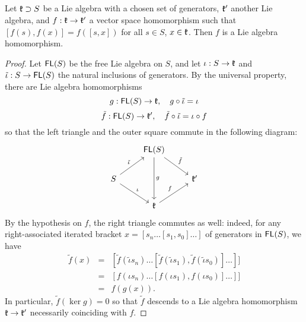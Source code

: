 \subsection{}
\begin{lem} \label{lem:aux}
        Let $\mathfrak{k} \supset S$ be a Lie algebra with a chosen set of generators,
$\mathfrak{k}'$ another Lie algebra, and $f : \mathfrak{k} \to \mathfrak{k}'$ a vector space homomorphism
such that $[f(s), f(x)] = f([s,x])$ for all $s \in S$, $x \in \mathfrak{k}$. Then $f$ is a
Lie algebra homomorphism. 
\end{lem}
\begin{proof}Let $\operatorname{\mathsf{FL}}(S)$ be the free Lie algebra on $S$, and let $\iota : S \to \mathfrak{k}$ and
        $\tilde\iota : S \to \operatorname{\mathsf{FL}}(S)$ the natural inclusions of generators. By the universal
property, there are Lie algebra homomorphisms 
\[  g : \operatorname{\mathsf{FL}}(S) \to \mathfrak{k},\quad  g \circ \tilde\iota = \iota \]
\[  \tilde f: \operatorname{\mathsf{FL}}(S) \to \mathfrak{k}',\quad \tilde f \circ \tilde\iota = \iota\circ f \]
so that the left triangle and the outer square commute in the following
diagram:
\[\begin{tikzcd}
& \FL(S) \arrow[dr,"\tilde f"] \arrow[dd,"g"]\\
        S \arrow[dr,"\iota"] \arrow[ur,"\tilde\iota"] & & \fk' \\
                                             & \fk \arrow[ur,"f"]  
\end{tikzcd}\]
By the hypothesis on $f$, the right triangle commutes as well: indeed,
for any right-associated iterated bracket $x = [s_n\dots[s_1,s_0]\dots]$ of generators 
in $\operatorname{\mathsf{FL}}(S)$, we have 
\begin{eqnarray*}
        \tilde f(x) &=& [\tilde f(\tilde\iota s_n)\dots[\tilde f(\tilde\iota s_1),\tilde f(\tilde\iota s_0)]\dots]]
                  \\&=& [f (\iota s_n)\dots [f (\iota s_1), f(\iota s_0)]\dots]]
                  \\&=& f(g(x)).
\end{eqnarray*}
In particular, $\tilde f(\ker g)=0$ so that $\tilde f$ descends to a Lie algebra
homomorphism $\mathfrak{k}\to\mathfrak{k}'$ necessarily coinciding with $f$.
\end{proof}

